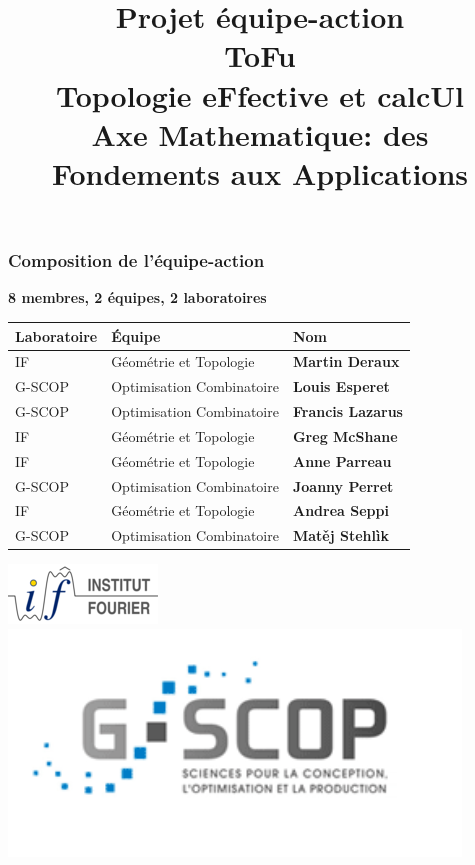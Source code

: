 \documentclass[a4paper,compress]{beamer}  %
\title[PERSYVAL-Lab]{Projet équipe-action\\
  {\bf {\huge \alert{ToFu} \\Topologie eFfective et calcUl}\\
    \bigskip
Axe Mathematique: des Fondements aux Applications
}}
\date{}
\theoremstyle{definition}
\begin{document}

\begin{frame}
  \titlepage{}
  \end{frame}

\begin{frame}
\frametitle{Composition de l'équipe-action}
\begin{center}
\textbf{8 membres, 2 équipes, 2 laboratoires}
\vspace{1cm}

\begin{tabular}{|l  | l @{} |l|}
  \hline
 Laboratoire & Équipe & Nom \\
\hline \hline
\rowcolor{LightGreen4}
\cellcolor{LightGreen1}IF & {\small Géométrie et Topologie} & {\bf  Martin Deraux} \\
\hline
\rowcolor{LightBlue2}
\cellcolor{LightBlue1}G-SCOP & {\small Optimisation Combinatoire} & {\bf Louis Esperet} \\
\hline
\rowcolor{LightOrange2}
\cellcolor{LightBlue1}G-SCOP & {\small Optimisation Combinatoire} & {\bf  Francis Lazarus} \\
\hline
\rowcolor{LightOrange2}
\cellcolor{LightGreen1}IF & {\small Géométrie et Topologie} & {\bf  Greg McShane} \\
\hline
\rowcolor{LightGreen4}
\cellcolor{LightGreen1}IF & {\small Géométrie et Topologie}& {\bf  Anne Parreau} \\
\hline
\rowcolor{LightBlue2}
\cellcolor{LightBlue1}G-SCOP & {\small Optimisation Combinatoire} & {\bf  Joanny Perret
} \\
\hline
\rowcolor{LightGreen4}
\cellcolor{LightGreen1}IF & {\small Géométrie et Topologie} & {\bf   Andrea Seppi} \\
\hline
\rowcolor{LightBlue2}
\cellcolor{LightBlue1}G-SCOP & {\small Optimisation Combinatoire}& {\bf Mat\v{e}j Stehl\`ik} \\
\hline
\end{tabular}
\end{center}
    \includegraphics[scale=.5]{iflogo-azur-sable-150x60_0.png}  \hfill
\includegraphics[scale=.2]{gscop.png}  

\end{frame}
\end{document}
